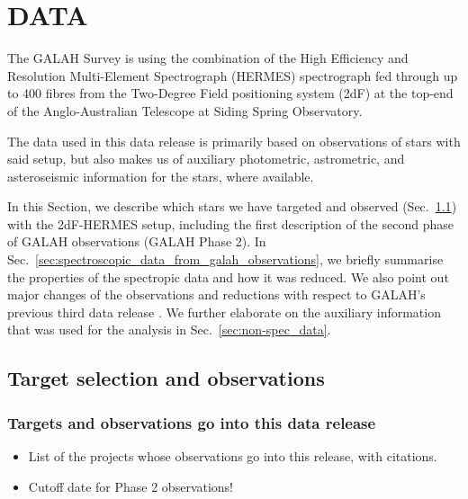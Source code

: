 \documentclass[
  journal=pasa,
  manuscript=research-paper, %
  year=2021,
  volume=37
]{cup-journal}
\begin{document}
\section{DATA}
\label{sec:data}

The GALAH Survey is using the combination of the High Efficiency and Resolution Multi-Element Spectrograph (HERMES) spectrograph fed through up to 400 fibres from the Two-Degree Field positioning system (2dF) at the top-end of the Anglo-Australian Telescope at Siding Spring Observatory.

The data used in this data release is primarily based on observations of stars with said setup, but also makes us of auxiliary photometric, astrometric, and asteroseismic information for the stars, where available.

In this Section, we describe which stars we have targeted and observed (Sec.~\ref{sec:target_selection_observations}) with the 2dF-HERMES setup, including the first description of the second phase of GALAH observations (GALAH Phase 2). In Sec.~\ref{sec:spectroscopic_data_from_galah_observations}, we briefly summarise the properties of the spectropic data and how it was reduced. We also point out major changes of the observations and reductions with respect to GALAH's previous third data release \citep{Buder2021}. We further elaborate on the auxiliary information that was used for the analysis in Sec.~\ref{sec:non-spec_data}.

\subsection{Target selection and observations} \label{sec:target_selection_observations}

\subsubsection{Targets and observations go into this data release}

\begin{itemize}
    \item List of the projects whose observations go into this release, with citations.
    \item Cutoff date for Phase 2 observations!
\end{itemize}
\end{document}
